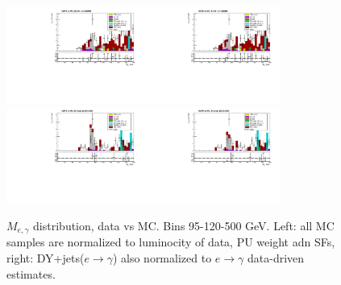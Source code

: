 \begin{figure}[htb]
\begin{center}
    \includegraphics[width=0.40\textwidth]{../figs/figs_v11/ELECTRON_WGamma/PrepareYields/c_TotalDATAvsMC_Barrel__Mpholep1PRELIMINARY_FOR_E_TO_GAMMA_WITH_PSV_CUT_pt120to500_.pdf}\includegraphics[width=0.40\textwidth]{../figs/figs_v11/ELECTRON_WGamma/PrepareYields/c_TotalDATAvsMC_Barrel__Mpholep1PRELIMINARY_FOR_E_TO_GAMMA_WITH_PSV_CUT_pt120to500__etogScale.pdf}\\
    \includegraphics[width=0.40\textwidth]{../figs/figs_v11/ELECTRON_WGamma/PrepareYields/c_TotalDATAvsMC_Endcap__Mpholep1PRELIMINARY_FOR_E_TO_GAMMA_WITH_PSV_CUT_pt120to500_.pdf}\includegraphics[width=0.40\textwidth]{../figs/figs_v11/ELECTRON_WGamma/PrepareYields/c_TotalDATAvsMC_Endcap__Mpholep1PRELIMINARY_FOR_E_TO_GAMMA_WITH_PSV_CUT_pt120to500__etogScale.pdf}\\
   \label{fig:Mpholep1DatavsMC_75to500}
  \caption{$M_{e,\gamma}$ distribution, data vs MC. Bins 95-120-500 GeV. Left: all MC samples are normalized to luminocity of data, PU weight adn SFs, right: DY+jets($e\rightarrow\gamma$) also normalized to $e\rightarrow\gamma$ data-driven estimates.}
  \end{center}
\end{figure}

